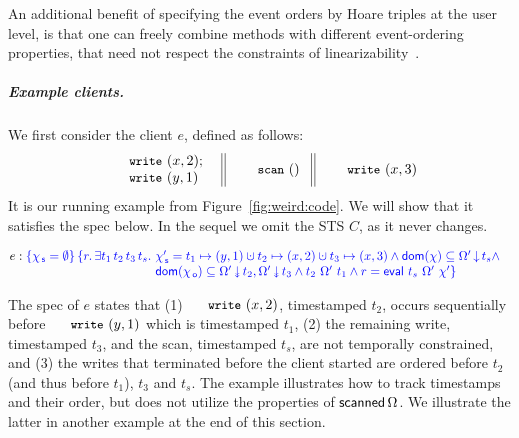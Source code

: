 \documentclass[a4paper,UKenglish]{lipics-v2016}
\newcommand{\dom}[1]{\mathsf{dom}(#1)}
\newcommand{\dotcup}{\ensuremath{\mathaccent\cdot\cup}}
\newcommand{\esc}[1]{\text{\texttt{\small{#1}}}}
\newcommand{\selfsub}{\mathsf{s}}
\newcommand{\othersub}{\mathsf{o}}
\newcommand{\hist}{\chi}
\newcommand{\histS}{\hist_{\, \selfsub}}
\newcommand{\histO}{\hist_{\, \othersub}}
\newcommand{\hempty}{\emptyset}
\newcommand{\hunion}{\mathbin{\dotcup}}
\newcommand{\hpts}{\mapsto}
\newcommand{\ldot}{\mathord{.}\,}
\newcommand{\stableorder}{\Omega}
\newcommand{\stableorderP}{\stableorder'}
\newcommand{\histP}{\chi'}
\newcommand{\tsPre}[1]{\ensuremath{{\textcolor{blue}{#1}}}}
\newcommand{\tsPos}[1]{\ensuremath{\textcolor{blue}{#1}}}
\theoremstyle{definition}
\begin{document}
An additional benefit of specifying the event orders by Hoare triples
at the user level, is that one can freely combine methods with
different event-ordering properties, that need not respect the
constraints of linearizability~\cite{SergeyNBD+OOPSLA16}.

\subparagraph*{Example clients.}

We first consider the client $e$, defined as follows:
%
\[
\hfill\begin{array}{l||l||l}
        \begin{array}{c}
         \esc{write}~(x,2);\\ 
         \esc{write}~(y,1)~ 
        \end{array}~
& ~\esc{scan}~()~ &~\esc{write}~(x,3)  
\end{array}\hfill
\]
%
It is our running example from Figure~\ref{fig:weird:code}. We will
show that it satisfies the spec below. In the sequel we omit the STS
$C$, as it never changes.

\[
\!\!\!\begin{array}{l}
e : 
  \tsPre{\{ \histS = \hempty \}}
\!\!\begin{array}[t]{l}
  \tsPos{\{ r\ldot \exists t_1\, t_2\, t_3\, t_s \ldot\,
    \histS' = t_1 \hpts (y,1) \hunion t_2 
    \hpts (x,2) \hunion t_3 \hpts (x,3)\wedge
    \dom{\hist} \subseteq \ideal{\stableorderP}{t_s}\wedge\!}\\
  \tsPos{\hphantom{\{ r\ldot \exists t_1\, t_2\, t_3\, t_s \ldot}\, 
    \dom{\histO} \subseteq \sideal{\stableorderP}{t_2},
    \sideal{\stableorderP}{t_3} \wedge 
%
    t_2\ {\stableorderP}\ t_1 \wedge r = \eval\ t_s\ \stableorderP\ \histP \}}\\
\end{array}
\end{array}
\]

The spec of $e$ states that (1) $\esc{write}~(x,2)$, timestamped
$t_2$, occurs sequentially before $\esc{write}~(y,1)$ which is
timestamped $t_1$, (2) the remaining write, timestamped $t_3$, and the
scan, timestamped $t_s$, are not temporally constrained, and (3) the
writes that terminated before the client started are ordered before
$t_2$ (and thus before $t_1$), $t_3$ and $t_s$. The example
illustrates how to track timestamps and their order, but does not
utilize the properties of $\scanned{\stableorder}$. We illustrate the
latter in another example at the end of this section.
\end{document}
